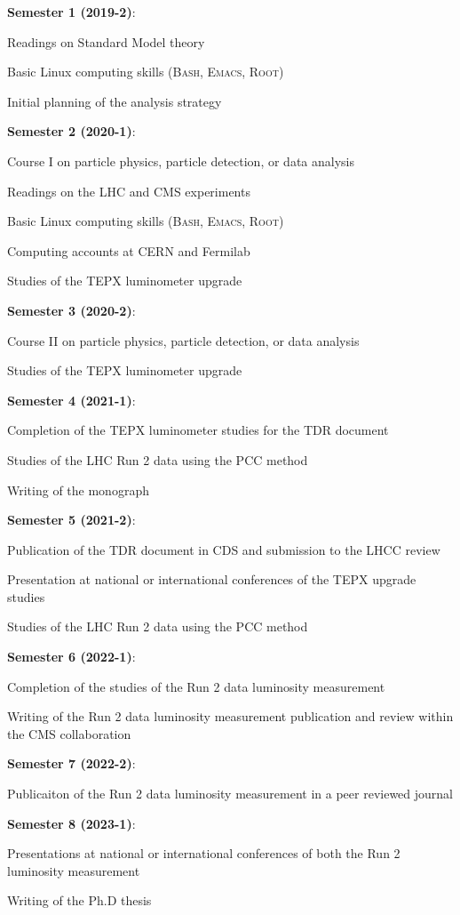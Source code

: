 \documentclass[final,12p]{article}
\newcommand{\SubItem}[1]{ {\setlength\itemindent{15pt} \item[-] #1} }
\begin{document}
\begin{itemize}

\item {\bf Semester 1 (2019-2)}:
  \SubItem{ Readings on Standard Model theory}
  \SubItem{ Basic Linux computing skills (\textsc{Bash, Emacs, Root})}
  \SubItem{ Initial planning of the analysis strategy}

\item {\bf Semester 2 (2020-1)}:
  \SubItem{ Course I on particle physics, particle detection, or data analysis}
  \SubItem{ Readings on the LHC and CMS experiments}
  \SubItem{ Basic Linux computing skills (\textsc{Bash, Emacs, Root})}
  \SubItem{ Computing accounts at CERN and Fermilab}
  \SubItem{ Studies of the TEPX luminometer upgrade}

\item {\bf Semester 3 (2020-2)}:
  \SubItem{ Course II on particle physics, particle detection, or  data analysis}
  \SubItem{ Studies of the TEPX luminometer upgrade}

\item {\bf Semester 4 (2021-1)}:
  \SubItem{ Completion of the TEPX luminometer studies for the TDR document}
  \SubItem{ Studies of the LHC Run 2 data using the PCC method}
  \SubItem{ Writing of the monograph}

\item {\bf Semester 5 (2021-2)}:
  \SubItem{ Publication of the TDR document in CDS and submission to the LHCC review}
  \SubItem{ Presentation at national or international conferences of the TEPX upgrade studies}
  \SubItem{ Studies of the LHC Run 2 data using the PCC method}
  
\item {\bf Semester 6 (2022-1)}:
  \SubItem{ Completion of the studies of the Run 2 data luminosity measurement}
  \SubItem{ Writing of the Run 2 data luminosity measurement publication and review within the CMS collaboration}

\item {\bf Semester 7 (2022-2)}:
  \SubItem{ Publicaiton of the Run 2 data luminosity measurement in a peer reviewed journal}

\item {\bf Semester 8 (2023-1)}: 
  \SubItem{ Presentations at national or international conferences of both the Run 2 luminosity measurement}
  \SubItem{ Writing of the Ph.D thesis}
  
\end{itemize}


\onehalfspacing


\end{document}
